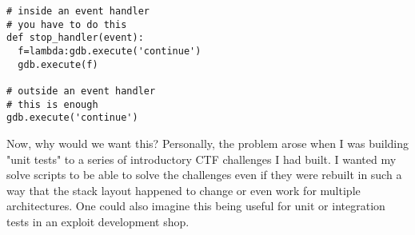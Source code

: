 \documentclass[twocolumn]{article}
\begin{document}
\begin{verbatim}
# inside an event handler
# you have to do this
def stop_handler(event):
  f=lambda:gdb.execute('continue')
  gdb.execute(f)

# outside an event handler
# this is enough
gdb.execute('continue')
\end{verbatim}

Now, why would we want this? Personally, the problem arose when I was building "unit tests" to a series of introductory CTF challenges I had built. I wanted my solve scripts to be able to solve the challenges even if they were rebuilt in such a way that the stack layout happened to change or even work for multiple architectures. One could also imagine this being useful for unit or integration tests in an exploit development shop.

\end{document}
